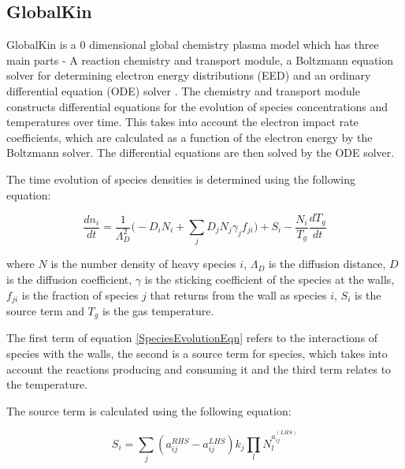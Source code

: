\documentclass[11pt, oneside]{article}   	%
\begin{document}
\subsection{GlobalKin}
GlobalKin is a 0 dimensional global chemistry plasma model which has three main parts - A reaction chemistry and transport module, a Boltzmann equation solver for determining electron energy distributions (EED) and an ordinary differential equation (ODE) solver \cite{Stafford2004O2}.
The chemistry and transport module constructs differential equations for the evolution of species concentrations and temperatures over time. 
This takes into account the electron impact rate coefficients, which are calculated as a function of the electron energy by the Boltzmann solver.
The differential equations are then solved by the ODE solver.

The time evolution of species densities is determined using the following equation:

\begin{equation}
\frac{dn_i}{dt} = \frac{1}{\Lambda_D^2}\bigg(-D_iN_i + \sum_jD_jN_j\gamma_jf_{ji}\bigg) + S_i - \frac{N_i}{T_g}\frac{dT_g}{dt}
\label{SpeciesEvolutionEqn}
\end{equation}

where $N$ is the number density of heavy species $i$, $\Lambda_D$ is the diffusion distance, $D$ is the diffusion coefficient, $\gamma$ is the sticking coefficient of the species at the walls, $f_{ji}$ is the fraction of species $j$ that returns from the wall as species $i$, $S_i$ is the source term and $T_g$ is the gas temperature.

The first term of equation \ref{SpeciesEvolutionEqn} refers to the interactions of species with the walls, the second is a source term for species, which takes into account the reactions producing and consuming it and the third term relates to the temperature.

The source term is calculated using the following equation:

\begin{equation}
S_i = \sum_j(a_{ij}^{RHS}-a_{ij}^{LHS})k_j\prod_lN_l^{a_{ij}^{(LHS)}}
\label{SourceTermEqn}
\end{equation}
\end{document}
